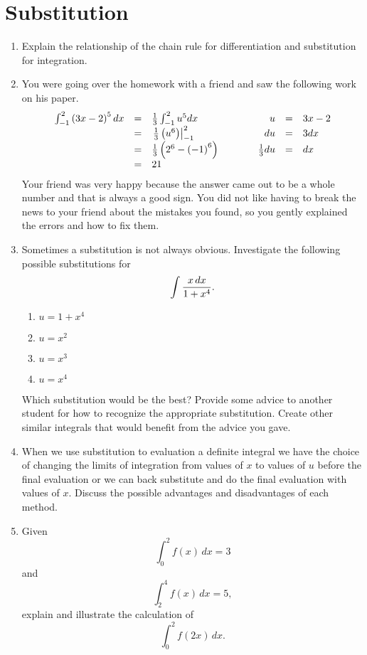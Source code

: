 \begin{enumerate}
\end{enumerate}\section{Substitution}\begin{enumerate}

\item   Explain the relationship of the chain rule for differentiation and substitution for integration.







\item   You were going over the homework with a friend and saw the following work on his paper.
		$$\begin{array}{rclcrcl}
\int_{ - 1}^2 {\left( {3x - 2} \right)^5 dx} & =& {1 \over 3}\int_{ - 1}^2 {u^5 dx} &\ \ \ \ \ \ \mbox{}& u &=& 3x - 2 \cr  
  & =& \left. {{1 \over 3}\left( {u^6 } \right)} \right|_{ - 1}^2 &&  du &=& 3dx \cr  
  &  =& {1 \over 3}\left( {2^6  - \left( { - 1} \right)^6 } \right) &&  {1 \over 3}du &=& dx \cr    
  &= &21&& \cr\end{array}$$
Your friend was very happy because the answer came out to be a whole number and that is always a good sign.  You did not like having to break the news to your friend about the mistakes you found, so you gently explained the errors and how to fix them.

\item   Sometimes a substitution is not always obvious.  Investigate the following possible substitutions for $$\int {{{x\,dx} \over {1 + x^4 }}} .$$	
\begin{enumerate} \item $u = 1 + x^4$\item $u = x^2$\item $u = x^3$\item $u = x^4$\end{enumerate}
Which substitution would be the best?  Provide some advice to another student for how to recognize the appropriate substitution.  Create other similar integrals that would benefit from the advice you gave.

\item   When we use substitution to evaluation a definite integral we have the choice of changing the limits of integration from values of $x$ to values of $u$ before the final evaluation or we can back substitute and do the final evaluation with values of $x$.  Discuss the possible advantages and disadvantages of each method.  \cite{EP}

\item   Given $$\int_0^2 {f(x)\,dx}  = 3$$ and $$\int_2^4 {f(x)\,dx}  = 5,$$ explain and illustrate the calculation of $$\int_0^2 {f(2x)\,dx} .$$  


\end{enumerate}
